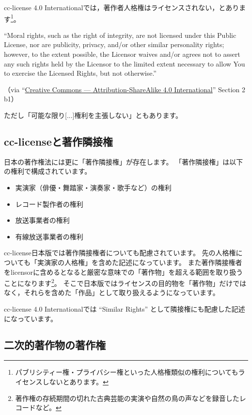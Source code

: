 \documentclass{ltjsarticle}
\begin{document}
cc-license 4.0 Internationalでは，著作者人格権はライセンスされない，とあります\footnote{パブリシティー権・プライバシー権といった人格権類似の権利についてもライセンスしないとあります。}。
\begin{mdframed}
 ``Moral rights, such as the right of integrity, are not licensed under this Public License, nor are publicity, privacy, and/or other similar personality rights; however, to the extent possible, the Licensor waives and/or agrees not to assert any such rights held by the Licensor to the limited extent necessary to allow You to exercise the Licensed Rights, but not otherwise.'' \par
（via  ``\href{http://creativecommons.org/licenses/by-sa/4.0/legalcode}{Creative Commons — Attribution-ShareAlike 4.0 International}''  Section 2 b1）
\end{mdframed}
ただし「可能な限り[...]権利を主張しない」ともあります。


\subsection{cc-licenseと著作隣接権}

日本の著作権法には更に「著作隣接権」が存在します。
「著作隣接権」は以下の権利で構成されています。
\begin{itemize}
\item 実演家（俳優・舞踏家・演奏家・歌手など）の権利
\item レコード製作者の権利
\item 放送事業者の権利
\item 有線放送事業者の権利
\end{itemize}
cc-license日本版では著作隣接権者についても配慮されています。
先の人格権についても「実演家の人格権」を含めた記述になっています。
また著作隣接権者をlicensorに含めるとなると厳密な意味での「著作物」を超える範囲を取り扱うことになります\footnote{著作権の存続期間の切れた古典芸能の実演や自然の鳥の声などを録音したレコードなど。}。
そこで日本版ではライセンスの目的物を「著作物」だけではなく，それらを含めた「作品」として取り扱えるようになっています。

cc-license 4.0 Internationalでは ``Similar Rights'' として隣接権にも配慮した記述になっています。


\subsection{二次的著作物の著作権} \label{sec:adaptations}
\end{document}
